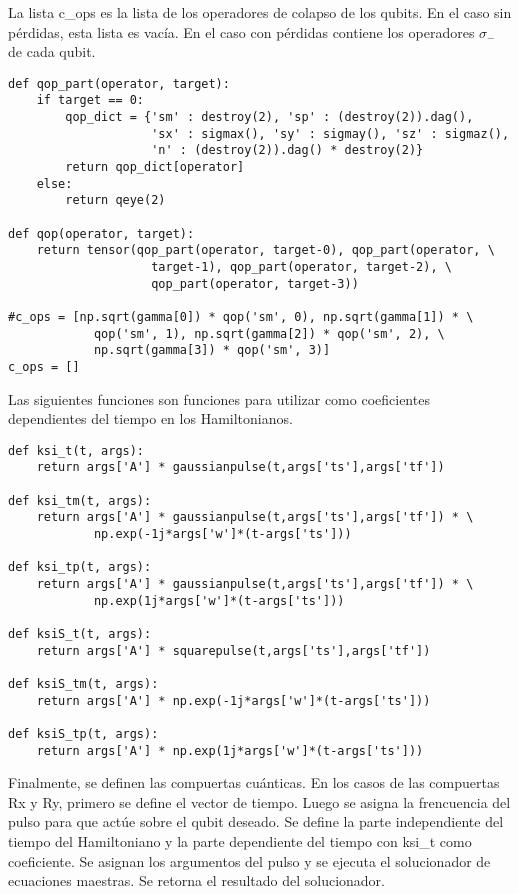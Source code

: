 La lista c\_ops es la lista de los operadores de colapso de los qubits. En el caso sin pérdidas, esta lista es vacía. En el caso con pérdidas contiene los operadores $\sigma_-$ de cada qubit.

\begin{verbatim}
def qop_part(operator, target):
    if target == 0:
        qop_dict = {'sm' : destroy(2), 'sp' : (destroy(2)).dag(), 
                    'sx' : sigmax(), 'sy' : sigmay(), 'sz' : sigmaz(),
                    'n' : (destroy(2)).dag() * destroy(2)}
        return qop_dict[operator]
    else:
        return qeye(2)

def qop(operator, target):
    return tensor(qop_part(operator, target-0), qop_part(operator, \
                    target-1), qop_part(operator, target-2), \
                    qop_part(operator, target-3))
    
#c_ops = [np.sqrt(gamma[0]) * qop('sm', 0), np.sqrt(gamma[1]) * \
            qop('sm', 1), np.sqrt(gamma[2]) * qop('sm', 2), \
            np.sqrt(gamma[3]) * qop('sm', 3)]
c_ops = []
\end{verbatim}

Las siguientes funciones son funciones para utilizar como coeficientes dependientes del tiempo en los Hamiltonianos.

\begin{verbatim}
def ksi_t(t, args):
    return args['A'] * gaussianpulse(t,args['ts'],args['tf'])

def ksi_tm(t, args):
    return args['A'] * gaussianpulse(t,args['ts'],args['tf']) * \
            np.exp(-1j*args['w']*(t-args['ts']))

def ksi_tp(t, args):
    return args['A'] * gaussianpulse(t,args['ts'],args['tf']) * \
            np.exp(1j*args['w']*(t-args['ts']))

def ksiS_t(t, args):
    return args['A'] * squarepulse(t,args['ts'],args['tf'])

def ksiS_tm(t, args):
    return args['A'] * np.exp(-1j*args['w']*(t-args['ts']))

def ksiS_tp(t, args):
    return args['A'] * np.exp(1j*args['w']*(t-args['ts']))
\end{verbatim}

Finalmente, se definen las compuertas cuánticas. En los casos de las compuertas Rx y Ry, primero se define el vector de tiempo. Luego se asigna la frencuencia del pulso para que actúe sobre el qubit deseado. Se define la parte independiente del tiempo del Hamiltoniano y la parte dependiente del tiempo con ksi\_t como coeficiente. Se asignan los argumentos del pulso y se ejecuta el solucionador de ecuaciones maestras. Se retorna el resultado del solucionador.

